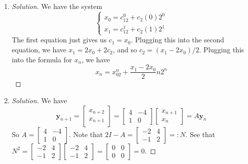 \documentclass{article}
\begin{document}
\begin{enumerate}
	\item \begin{proof}[Solution]\let\qed\relax
		We have the system
		\[
			\begin{cases}
				x_0 = c_12^0 + c_2(0)2^0\\
				x_1 = c_12^1 + c_2(1)2^1
			\end{cases}
		\]
		The first equation just gives us $c_1 = x_0$.
		Plugging this into the second equation, we have
		$x_1 = 2x_0 + 2c_2$, and so $c_2 = (x_1 - 2x_0)/2$.
		Plugging this into the formula for $x_n$, we have
		\[
			x_n = x_02^n + \frac{x_1 - 2x_0}{2}n2^n
		\]
	\end{proof}
	\item \begin{proof}[Solution]\let\qed\relax
		We have
		\[
			\mathbf{y}_{n+1} = \begin{bmatrix} x_{n+2} \\ x_{n+1} \end{bmatrix}
			= \begin{bmatrix} 4 & -4 \\ 1 & 0 \end{bmatrix} \begin{bmatrix} x_{n+1} \\ x_n \end{bmatrix}
			= A\mathbf{y}_n
		\]
		So $A = \begin{bmatrix} 4 & -4 \\ 1 & 0 \end{bmatrix}$.
		Note that $2I - A = \begin{bmatrix} -2 & 4\\ -1 & 2 \end{bmatrix} =: N$.
		See that $N^2 = \begin{bmatrix} -2 & 4\\ -1 & 2 \end{bmatrix}
		\begin{bmatrix} -2 & 4\\ -1 & 2 \end{bmatrix}
		= \begin{bmatrix} 0 & 0 \\ 0 & 0 \end{bmatrix} = 0$.


\end{proof}
\end{enumerate}
\end{document}
